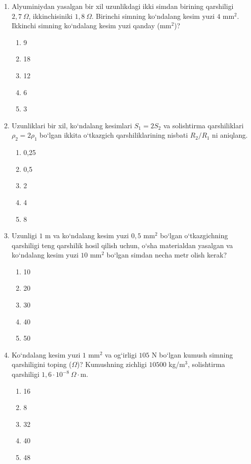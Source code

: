 \begin{enumerate}
\item Alyuminiydan yasalgan bir xil uzunlikdagi ikki simdan birining qarshiligi $2,7~\Omega$, ikkinchisiniki $1,8~\Omega$. Birinchi simning ko‘ndalang kesim yuzi $4$ mm$^2$. Ikkinchi simning ko‘ndalang kesim yuzi qanday (mm$^2$)?
\begin{enumerate}[label=\Alph*)]
\item 9
\item 18
\item 12
\item 6
\item 3
\end{enumerate}

\item Uzunliklari bir xil, ko‘ndalang kesimlari $S_1=2S_2$ va solishtirma qarshiliklari $\rho_2=2\rho_1$ bo‘lgan ikkita o‘tkazgich qarshiliklarining nisbati $R_2/R_1$ ni aniqlang.
\begin{enumerate}[label=\Alph*)]
\item 0,25
\item 0,5
\item 2
\item 4
\item 8
\end{enumerate}

\item Uzunligi $1$ m va ko‘ndalang kesim yuzi $0,5$ mm$^2$ bo‘lgan o‘tkazgichning qarshiligi teng qarshilik hosil qilish uchun, o‘sha materialdan yasalgan va ko‘ndalang kesim yuzi $10$ mm$^2$ bo‘lgan simdan necha metr olish kerak?
\begin{enumerate}[label=\Alph*)]
\item 10
\item 20
\item 30
\item 40
\item 50
\end{enumerate}

\item Ko‘ndalang kesim yuzi $1$ mm$^2$ va og‘irligi $105$ N bo‘lgan kumush simning qarshiligini toping ($\Omega$)? Kumushning zichligi $10500$ kg/m$^3$, solishtirma qarshiligi $1,6\cdot10^{-8}~\Omega\cdot$m.
\begin{enumerate}[label=\Alph*)]
\item 16
\item 8
\item 32
\item 40
\item 48
\end{enumerate}


\end{enumerate}
